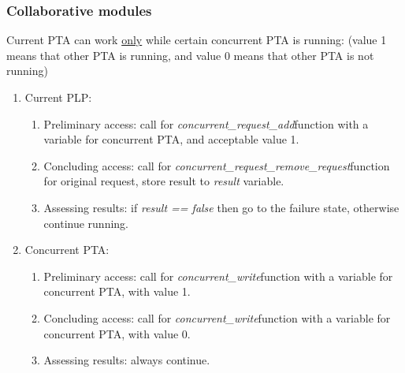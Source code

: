 \subsubsection{Collaborative modules \label{memory_module_applications_collaborative_modules}}
Current PTA can work \underline{only} while certain concurrent PTA is running: (value 1 means that other PTA is running, and value 0 means that other PTA is not running)
\begin{enumerate}  
\item Current PLP:
\begin{enumerate}  
\item Preliminary access: call for \textcolor{ColorUppaalFunction}{\textit{concurrent_request_add}}​ function with a variable for concurrent PTA, and acceptable value 1. 
\item Concluding access: call for \textcolor{ColorUppaalFunction}{\textit{concurrent_request_remove_request}}​ function for original request, store result to \textcolor{ColorEdgeGuard}{\textit{result}} variable. 
\item Assessing results: if \textcolor{ColorEdgeGuard}{\textit{result == false}} then go to the failure state, otherwise continue running.
\end{enumerate}  
\item Concurrent PTA:
\begin{enumerate} 
\item Preliminary access: call for \textcolor{ColorUppaalFunction}{\textit{concurrent_write}}​ function with a variable for concurrent PTA, with value 1. 
\item Concluding access: call for \textcolor{ColorUppaalFunction}{\textit{concurrent_write}}​ function with a variable for concurrent PTA, with value 0. 
\item Assessing results: always continue.
\end{enumerate}
\end{enumerate}
